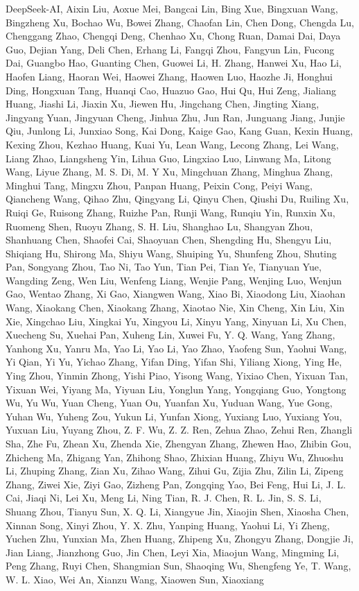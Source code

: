 \documentclass[
  10
]{article}
\begin{document}
DeepSeek-AI, Aixin Liu, Aoxue Mei, Bangcai Lin, Bing Xue, Bingxuan Wang,
Bingzheng Xu, Bochao Wu, Bowei Zhang, Chaofan Lin, Chen Dong, Chengda
Lu, Chenggang Zhao, Chengqi Deng, Chenhao Xu, Chong Ruan, Damai Dai,
Daya Guo, Dejian Yang, Deli Chen, Erhang Li, Fangqi Zhou, Fangyun Lin,
Fucong Dai, Guangbo Hao, Guanting Chen, Guowei Li, H. Zhang, Hanwei Xu,
Hao Li, Haofen Liang, Haoran Wei, Haowei Zhang, Haowen Luo, Haozhe Ji,
Honghui Ding, Hongxuan Tang, Huanqi Cao, Huazuo Gao, Hui Qu, Hui Zeng,
Jialiang Huang, Jiashi Li, Jiaxin Xu, Jiewen Hu, Jingchang Chen,
Jingting Xiang, Jingyang Yuan, Jingyuan Cheng, Jinhua Zhu, Jun Ran,
Junguang Jiang, Junjie Qiu, Junlong Li, Junxiao Song, Kai Dong, Kaige
Gao, Kang Guan, Kexin Huang, Kexing Zhou, Kezhao Huang, Kuai Yu, Lean
Wang, Lecong Zhang, Lei Wang, Liang Zhao, Liangsheng Yin, Lihua Guo,
Lingxiao Luo, Linwang Ma, Litong Wang, Liyue Zhang, M. S. Di, M. Y Xu,
Mingchuan Zhang, Minghua Zhang, Minghui Tang, Mingxu Zhou, Panpan Huang,
Peixin Cong, Peiyi Wang, Qiancheng Wang, Qihao Zhu, Qingyang Li, Qinyu
Chen, Qiushi Du, Ruiling Xu, Ruiqi Ge, Ruisong Zhang, Ruizhe Pan, Runji
Wang, Runqiu Yin, Runxin Xu, Ruomeng Shen, Ruoyu Zhang, S. H. Liu,
Shanghao Lu, Shangyan Zhou, Shanhuang Chen, Shaofei Cai, Shaoyuan Chen,
Shengding Hu, Shengyu Liu, Shiqiang Hu, Shirong Ma, Shiyu Wang, Shuiping
Yu, Shunfeng Zhou, Shuting Pan, Songyang Zhou, Tao Ni, Tao Yun, Tian
Pei, Tian Ye, Tianyuan Yue, Wangding Zeng, Wen Liu, Wenfeng Liang,
Wenjie Pang, Wenjing Luo, Wenjun Gao, Wentao Zhang, Xi Gao, Xiangwen
Wang, Xiao Bi, Xiaodong Liu, Xiaohan Wang, Xiaokang Chen, Xiaokang
Zhang, Xiaotao Nie, Xin Cheng, Xin Liu, Xin Xie, Xingchao Liu, Xingkai
Yu, Xingyou Li, Xinyu Yang, Xinyuan Li, Xu Chen, Xuecheng Su, Xuehai
Pan, Xuheng Lin, Xuwei Fu, Y. Q. Wang, Yang Zhang, Yanhong Xu, Yanru Ma,
Yao Li, Yao Li, Yao Zhao, Yaofeng Sun, Yaohui Wang, Yi Qian, Yi Yu,
Yichao Zhang, Yifan Ding, Yifan Shi, Yiliang Xiong, Ying He, Ying Zhou,
Yinmin Zhong, Yishi Piao, Yisong Wang, Yixiao Chen, Yixuan Tan, Yixuan
Wei, Yiyang Ma, Yiyuan Liu, Yonglun Yang, Yongqiang Guo, Yongtong Wu, Yu
Wu, Yuan Cheng, Yuan Ou, Yuanfan Xu, Yuduan Wang, Yue Gong, Yuhan Wu,
Yuheng Zou, Yukun Li, Yunfan Xiong, Yuxiang Luo, Yuxiang You, Yuxuan
Liu, Yuyang Zhou, Z. F. Wu, Z. Z. Ren, Zehua Zhao, Zehui Ren, Zhangli
Sha, Zhe Fu, Zhean Xu, Zhenda Xie, Zhengyan Zhang, Zhewen Hao, Zhibin
Gou, Zhicheng Ma, Zhigang Yan, Zhihong Shao, Zhixian Huang, Zhiyu Wu,
Zhuoshu Li, Zhuping Zhang, Zian Xu, Zihao Wang, Zihui Gu, Zijia Zhu,
Zilin Li, Zipeng Zhang, Ziwei Xie, Ziyi Gao, Zizheng Pan, Zongqing Yao,
Bei Feng, Hui Li, J. L. Cai, Jiaqi Ni, Lei Xu, Meng Li, Ning Tian, R. J.
Chen, R. L. Jin, S. S. Li, Shuang Zhou, Tianyu Sun, X. Q. Li, Xiangyue
Jin, Xiaojin Shen, Xiaosha Chen, Xinnan Song, Xinyi Zhou, Y. X. Zhu,
Yanping Huang, Yaohui Li, Yi Zheng, Yuchen Zhu, Yunxian Ma, Zhen Huang,
Zhipeng Xu, Zhongyu Zhang, Dongjie Ji, Jian Liang, Jianzhong Guo, Jin
Chen, Leyi Xia, Miaojun Wang, Mingming Li, Peng Zhang, Ruyi Chen,
Shangmian Sun, Shaoqing Wu, Shengfeng Ye, T. Wang, W. L. Xiao, Wei An,
Xianzu Wang, Xiaowen Sun, Xiaoxiang
\end{document}
